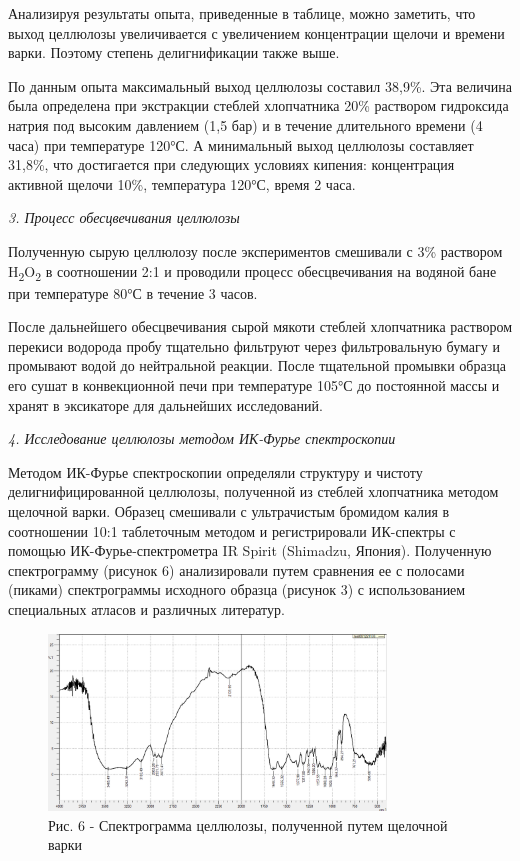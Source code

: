 \begin{multicols}{2}
Анализируя результаты опыта, приведенные в таблице, можно заметить, что
выход целлюлозы увеличивается с увеличением концентрации щелочи и
времени варки. Поэтому степень делигнификации также выше.

По данным опыта максимальный выход целлюлозы составил 38,9\%. Эта
величина была определена при экстракции стеблей хлопчатника 20\%
раствором гидроксида натрия под высоким давлением (1,5 бар) и в течение
длительного времени (4 часа) при температуре 120°С. А минимальный выход
целлюлозы составляет 31,8\%, что достигается при следующих условиях
кипения: концентрация активной щелочи 10\%, температура 120°С, время 2
часа.

\emph{3. Процесс обесцвечивания целлюлозы}

Полученную сырую целлюлозу после экспериментов смешивали с 3\% раствором
H\textsubscript{2}O\textsubscript{2} в соотношении 2:1 и проводили
процесс обесцвечивания на водяной бане при температуре 80°С в течение 3
часов.

После дальнейшего обесцвечивания сырой мякоти стеблей хлопчатника
раствором перекиси водорода пробу тщательно фильтруют через
фильтровальную бумагу и промывают водой до нейтральной реакции. После
тщательной промывки образца его сушат в конвекционной печи при
температуре 105°С до постоянной массы и хранят в эксикаторе для
дальнейших исследований.

\emph{4. Исследование целлюлозы методом ИК-Фурье спектроскопии}

Методом ИК-Фурье спектроскопии определяли структуру и чистоту
делигнифицированной целлюлозы, полученной из стеблей хлопчатника методом
щелочной варки. Образец смешивали с ультрачистым бромидом калия в
соотношении 10:1 таблеточным методом и регистрировали ИК-спектры с
помощью ИК-Фурье-спектрометра IR Spirit (Shimadzu, Япония). Полученную
спектрограмму (рисунок 6) анализировали путем сравнения ее с полосами
(пиками) спектрограммы исходного образца (рисунок 3) с использованием
специальных атласов и различных литератур.
\end{multicols}

\begin{figure}[H]
	\centering
	\includegraphics[width=0.8\textwidth]{assets/81}
	\caption*{Рис. 6 - Спектрограмма целлюлозы, полученной путем щелочной варки}
\end{figure}

